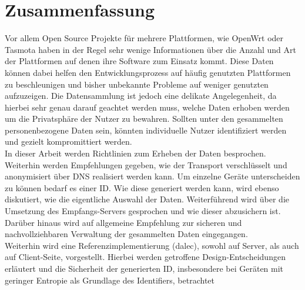 \chapter*{Zusammenfassung}
\label{chap:abstract_de}

Vor allem Open Source Projekte für mehrere Plattformen, wie OpenWrt oder Tasmota haben in der Regel sehr wenige Informationen über die Anzahl und Art der Plattformen auf denen ihre Software zum Einsatz kommt. Diese Daten können dabei helfen den Entwicklungsprozess auf häufig genutzten Plattformen zu beschleunigen und bisher unbekannte Probleme auf weniger genutzten aufzuzeigen. Die Datensammlung ist jedoch eine delikate Angelegenheit, da hierbei sehr genau darauf geachtet werden muss, welche Daten erhoben werden um die Privatsphäre der Nutzer zu bewahren. Sollten unter den gesammelten personenbezogene Daten sein, könnten individuelle Nutzer identifiziert werden und gezielt kompromittiert werden.\\

In dieser Arbeit werden Richtlinien zum Erheben der Daten besprochen. Weiterhin werden Empfehlungen gegeben, wie der Transport verschlüsselt und anonymisiert über DNS realisiert werden kann. Um einzelne Geräte unterscheiden zu können bedarf es einer ID. Wie diese generiert werden kann, wird ebenso diskutiert, wie die eigentliche Auswahl der Daten. Weiterführend wird über die Umsetzung des Empfangs-Servers gesprochen und wie dieser abzusichern ist. Darüber hinaus wird auf allgemeine Empfehlung zur sicheren und nachvollziehbaren Verwaltung der gesammelten Daten eingegangen.\\

Weiterhin wird eine Referenzimplementierung (dalec), sowohl auf Server, als auch auf Client-Seite, vorgestellt. Hierbei werden getroffene Design-Entscheidungen erläutert und die Sicherheit der generierten ID, insbesondere bei Geräten mit geringer Entropie als Grundlage des Identifiers, betrachtet

%

